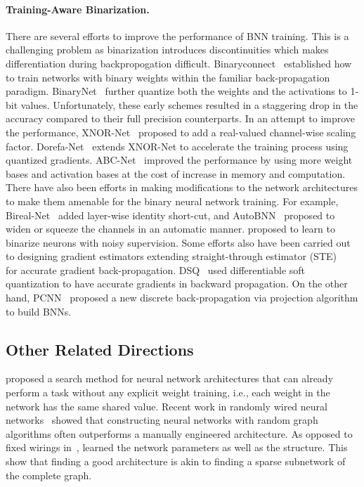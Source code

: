 \documentclass{article} \usepackage{iclr2021_conference,times}
\begin{document}
\paragraph{Training-Aware Binarization.}
There are several efforts to improve the performance of BNN training. This is a challenging problem as binarization introduces discontinuities which
makes differentiation during backpropogation difficult. 
Binaryconnect~\citep{courbariaux2015binaryconnect} established how to train networks with binary weights within the familiar back-propagation paradigm.
BinaryNet~\citep{courbariaux2016binarized} further quantize both the weights and the activations to 1-bit values.
Unfortunately, these early schemes resulted in a staggering drop in the accuracy compared to their full precision counterparts. 
In an attempt to improve the performance, XNOR-Net~\citep{rastegari2016xnornet} proposed to add a real-valued channel-wise scaling factor. 
Dorefa-Net~\citep{zhou2016dorefa} extends XNOR-Net to accelerate the training process using quantized gradients.
ABC-Net~\citep{lin2017towards} improved the performance by using more weight bases and activation bases at the cost of increase in memory and computation. There have also been efforts in making modifications to the network architectures to make them amenable for the binary neural network training. For example, Bireal-Net~\citep{liu2018bi} added layer-wise identity short-cut, and AutoBNN~\citep{shen2020balanced} proposed to widen or squeeze the channels in an automatic manner. \citep{han2020training} proposed to learn to binarize neurons with noisy supervision.
Some efforts also have been carried out to designing gradient estimators extending straight-through estimator (STE) ~\citep{bengio2013estimating} for accurate gradient back-propagation. DSQ~\citep{gong2019differentiable} used differentiable soft quantization to have accurate gradients in backward propagation.
On the other hand, PCNN~\cite{gu2019projection} proposed a new discrete back-propagation via projection algorithm to build BNNs.

\subsection{Other Related Directions}
\cite{gaier2019weight} proposed a search method for neural network architectures that can already perform a task without any explicit weight training, i.e., each weight in the network has the same shared value. Recent work in randomly wired neural networks~\citep{xie2019exploring} showed that constructing neural networks with random graph algorithms often outperforms a manually engineered architecture. As opposed to fixed wirings in~\citep{xie2019exploring}, \citep{wortsman2019discovering} learned the network parameters as well as the structure. 
This show that finding a good architecture is akin to finding a sparse subnetwork of the complete graph.
\end{document}
